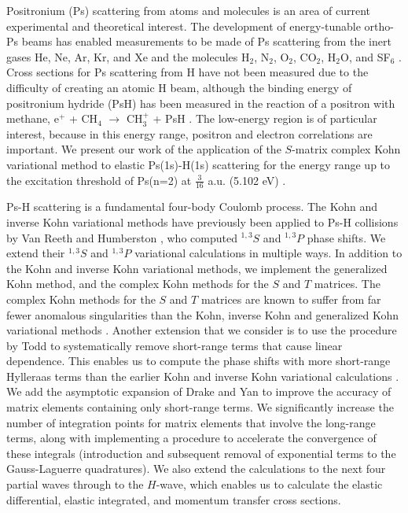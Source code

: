 \documentclass[preprint,showpacs,showkeys,preprintnumbers,amsmath,amssymb,longbibliography,pra,aps]{revtex4-1}
\begin{document}

Positronium (Ps) scattering from atoms and molecules is an area of current 
experimental and theoretical interest. The development of energy-tunable
ortho-Ps beams
\cite{Brown1985,Laricchia1987,Zafar1996,Garner1996,Laricchia2008} 
has enabled measurements to be made of Ps scattering from the inert gases He,
Ne, Ar, Kr, and Xe
\cite{Garner1996,Garner2000,Armitage2002,Laricchia2004,Armitage2006,Laricchia2008,Engbrecht2008,Brawley2010a}
and the molecules H$_2$, N$_2$, O$_2$, CO$_2$, H$_2$O, and SF$_6$
\cite{Garner1996,Garner1998,Garner2000,Laricchia2004,Armitage2006,Beale2006,Brawley2010a}.
Cross sections for Ps scattering from H have not been measured due to the
difficulty of creating an atomic H beam, although the binding energy of
positronium hydride (PsH) has been measured in the reaction of a positron with
methane, e$^+$ + CH$_4$ $\to$ CH$_3^+$ + PsH \cite{Schrader1992}. The low-energy
region is of particular interest, because in this energy range, positron and
electron correlations are important. We present our work of the application
of the $S$-matrix complex Kohn variational 
method to elastic Ps(1s)-H(1s) scattering for the energy range
up to the excitation threshold of Ps(n=2) at $\tfrac{3}{16}$ a.u.
(5.102 eV) \cite{Conferences1,Conferences2,Conferences3,Conferences4,Conferences5,WoodsDiss2015}.

Ps-H scattering is a fundamental four-body Coulomb process. The Kohn and 
inverse Kohn variational methods have previously been applied to Ps-H 
collisions by Van Reeth and Humberston \cite{VanReeth2003,VanReeth2004}, who 
computed $^{1,3}S$ and $^{1,3}P$ phase shifts. We 
extend their $^{1,3}S$ and $^{1,3}P$  variational calculations in 
multiple ways. In addition to
the Kohn and inverse Kohn variational methods, we implement the 
generalized Kohn method, and the complex Kohn methods for the $S$ and $T$ matrices.
The complex Kohn methods for the $S$ and $T$ matrices
are known to suffer from far fewer anomalous singularities than the Kohn,
inverse Kohn and generalized Kohn variational methods
\cite{Lucchese1989, Cooper2009, Cooper2010}. Another extension that we
consider is to use the procedure by Todd 
\cite{Todd2007} to systematically remove short-range terms that cause linear 
dependence. This enables us to compute the phase shifts
with more short-range Hylleraas terms than the earlier 
Kohn and inverse Kohn variational calculations
\cite{VanReeth2003, VanReeth2004}.
We add the asymptotic expansion of Drake and Yan
\cite{Drake1995, Yan1997} to improve the accuracy of matrix elements
containing only short-range terms. We significantly increase
the number of integration points for matrix
elements that involve the long-range terms, along with implementing a
procedure to
accelerate the convergence of these integrals (introduction
and subsequent removal of exponential terms to the Gauss-Laguerre
quadratures). We also extend the 
calculations to the next four partial waves through to the $H$-wave, which
enables us to calculate the elastic differential, elastic integrated,
and momentum transfer cross sections.
\end{document}
